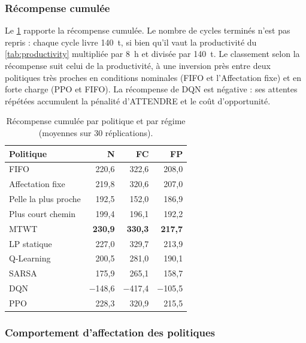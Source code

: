 \documentclass[11pt,a4paper]{article}
\newif\ifrevmarks
\newcommand{\revtag}[1]{\ifrevmarks\textsuperscript{\textcolor{red!70!black}{\scriptsize[#1]}}\fi}
\newenvironment{revbloc}[1]{\par\ifrevmarks\color{revcolor}\noindent\revtag{#1}\ \fi}{\par}
\newif\ifcorrmarks
\newcommand{\corr}[1]{\ifcorrmarks\textcolor{corrcolor}{#1}\else#1\fi}
\begin{document}
\subsubsection{\corr{Récompense cumulée}}
\label{sec:reward-results}
\begin{revbloc}{T31}
Le \cref{tab:cycles_reward} rapporte la récompense cumulée. \corr{Le nombre de cycles terminés n'est pas repris : chaque cycle livre 140~t, si bien qu'il vaut la productivité du \cref{tab:productivity} multipliée par 8~h et divisée par 140~t.} Le classement selon la récompense suit celui de la productivité, à une inversion près entre deux politiques très proches en conditions nominales (FIFO et l'Affectation fixe) et en forte charge (PPO et FIFO). La récompense de DQN est négative : ses attentes répétées accumulent la pénalité d'ATTENDRE et le coût d'opportunité.

\begin{table}[H]
\centering
\caption{\corr{Récompense cumulée par politique et par régime (moyennes sur 30 réplications).}}
\label{tab:cycles_reward}
\small
\begin{tabular}{@{}lrrr@{}}
\toprule
\textbf{Politique} & \textbf{N} & \textbf{FC} & \textbf{FP} \\
\midrule
FIFO                   & 220,6 & 322,6 & 208,0 \\
Affectation fixe       & 219,8 & 320,6 & 207,0 \\
Pelle la plus proche   & 192,5 & 152,0 & 186,9 \\
Plus court chemin      & 199,4 & 196,1 & 192,2 \\
MTWT                   & \textbf{230,9} & \textbf{330,3} & \textbf{217,7} \\
\corr{LP statique}     & 227,0 & 329,7 & 213,9 \\
\midrule
Q-Learning             & 200,5 & 281,0 & 190,1 \\
SARSA                  & 175,9 & 265,1 & 158,7 \\
DQN                    & $-$148,6 & $-$417,4 & $-$105,5 \\
PPO                    & 228,3 & 320,9 & 215,5 \\
\bottomrule
\end{tabular}
\end{table}
\end{revbloc}

\subsubsection{Comportement d'affectation des politiques}
\label{sec:behaviour}
\end{document}

